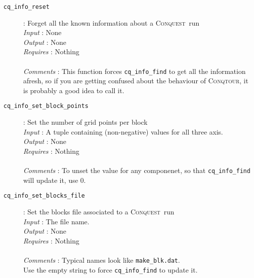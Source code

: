 \documentclass[a4paper,notitlepage,11pt]{article}
\def\CQ{\textsc{Conquest}}
\def\Conqtour{\textsc{Conqtour}}
\begin{document}
\begin{description}
\item[\texttt{cq\_info\_reset}]: Forget all the known information about a \CQ\ run\\
  \emph{Input} : None\\
  \emph{Output} : None\\
  \emph{Requires} : Nothing\\
  \\
  \emph{Comments} : This function forces \texttt{cq\_info\_find} to get all the information afresh, 
  so if you are getting confused about the behaviour of \Conqtour, it is probably a good idea to call it.
\end{description}

\begin{description}
\item[\texttt{cq\_info\_set\_block\_points}]: Set the number of grid points per block\\
  \emph{Input} : A tuple containing (non-negative) values for all three axis.\\
  \emph{Output} : None\\
  \emph{Requires} : Nothing\\
  \\
  \emph{Comments} : To unset the value for any componenet, so that \texttt{cq\_info\_find} will update it, use 0.\\
\end{description}

\begin{description}
\item[\texttt{cq\_info\_set\_blocks\_file}]: Set the blocks file associated to a \CQ\ run\\
  \emph{Input} : The file name.\\
  \emph{Output} : None\\
  \emph{Requires} : Nothing\\
  \\
  \emph{Comments} : Typical names look like \texttt{make\_blk.dat}.\\
  Use the empty string to force \texttt{cq\_info\_find} to update it.
\end{description}
\end{document}
